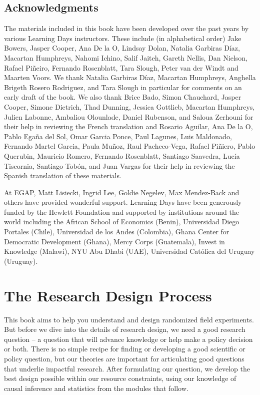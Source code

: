 \documentclass[12pt,]{book}
\begin{document}
\hypertarget{acknowledgments}{%
\section{Acknowledgments}\label{acknowledgments}}

The materials included in this book have been developed over the past years by various Learning Days instructors. These include (in alphabetical order) Jake Bowers, Jasper Cooper, Ana De la O, Lindsay Dolan, Natalia Garbiras Díaz, Macartan Humphreys, Nahomi Ichino, Salif Jaiteh, Gareth Nellis, Dan Nielson, Rafael Piñeiro, Fernando Rosenblatt, Tara Slough, Peter van der Windt and Maarten Voors. We thank Natalia Garbiras Díaz, Macartan Humphreys, Anghella Brigeth Rosero Rodriguez, and Tara Slough in particular for comments on an early draft of the book. We also thank
Brice Bado, Simon Chauchard, Jasper Cooper, Simone Dietrich, Thad Dunning, Jessica Gottlieb, Macartan Humphreys, Julien Labonne, Ambaliou Olounlade, Daniel Rubenson, and Saloua Zerhouni for their help in reviewing the French translation and Rosario Aguilar, Ana De la O, Pablo Egaña del Sol, Omar Garcia Ponce, Paul Lagunes, Luis Maldonado, Fernando Martel Garcia, Paula Muñoz, Raul Pacheco-Vega, Rafael Piñiero, Pablo Querubin, Mauricio Romero, Fernando Rosenblatt, Santiago Saavedra, Lucía Tiscornia, Santiago Tobón, and Juan Vargas for their help in reviewing the Spanish translation of these materials.

At EGAP, Matt Lisiecki, Ingrid Lee, Goldie Negelev, Max Mendez-Back and others have provided wonderful support. Learning Days have been generously funded by the Hewlett Foundation and supported by institutions around the world including the African School of Economics (Benin), Universidad Diego Portales (Chile), Universidad de los Andes (Colombia), Ghana Center for Democratic Development (Ghana), Mercy Corps (Guatemala), Invest in Knowledge (Malawi), NYU Abu Dhabi (UAE), Universidad Católica del Uruguay (Uruguay).

\hypertarget{the-research-design-process}{%
\chapter{The Research Design Process}\label{the-research-design-process}}

This book aims to help you understand and design randomized field experiments. But before we dive into the details of research design, we need a good research question -- a question that will advance knowledge or help make a policy decision or both. There is no simple recipe for finding or developing a good scientific or policy question, but our theories are important for articulating good questions that underlie impactful research. After formulating our question, we develop the best design possible within our resource constraints, using our knowledge of causal inference and statistics from the modules that follow.
\end{document}
